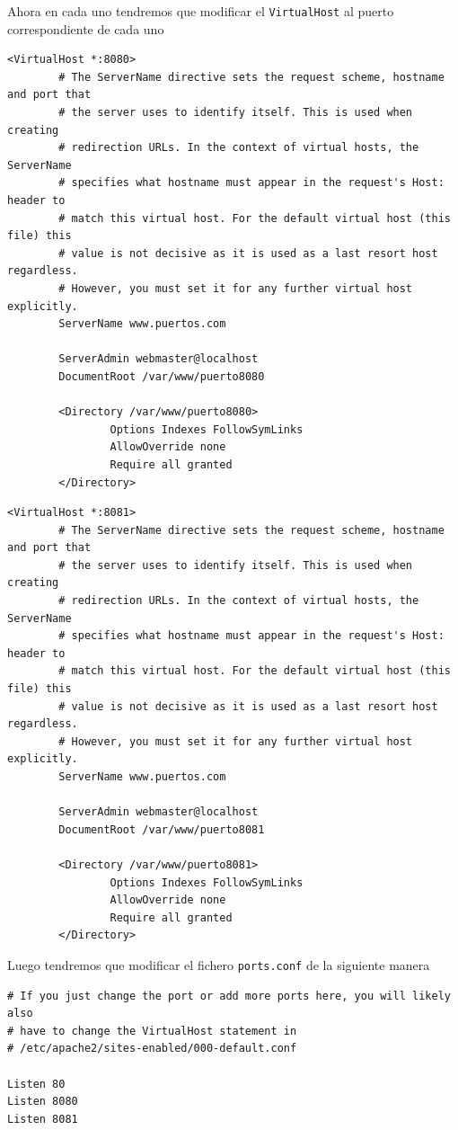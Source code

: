 \documentclass[11pt]{article}
\begin{document}
Ahora en cada uno tendremos que modificar el \texttt{VirtualHost} al puerto correspondiente de cada uno
\begin{verbatim}
<VirtualHost *:8080>
        # The ServerName directive sets the request scheme, hostname and port that
        # the server uses to identify itself. This is used when creating
        # redirection URLs. In the context of virtual hosts, the ServerName
        # specifies what hostname must appear in the request's Host: header to
        # match this virtual host. For the default virtual host (this file) this
        # value is not decisive as it is used as a last resort host regardless.
        # However, you must set it for any further virtual host explicitly.
        ServerName www.puertos.com

        ServerAdmin webmaster@localhost
        DocumentRoot /var/www/puerto8080

        <Directory /var/www/puerto8080>
                Options Indexes FollowSymLinks
                AllowOverride none
                Require all granted
        </Directory>
\end{verbatim}

\begin{verbatim}
<VirtualHost *:8081>
        # The ServerName directive sets the request scheme, hostname and port that
        # the server uses to identify itself. This is used when creating
        # redirection URLs. In the context of virtual hosts, the ServerName
        # specifies what hostname must appear in the request's Host: header to
        # match this virtual host. For the default virtual host (this file) this
        # value is not decisive as it is used as a last resort host regardless.
        # However, you must set it for any further virtual host explicitly.
        ServerName www.puertos.com

        ServerAdmin webmaster@localhost
        DocumentRoot /var/www/puerto8081

        <Directory /var/www/puerto8081>
                Options Indexes FollowSymLinks
                AllowOverride none
                Require all granted
        </Directory>
\end{verbatim}

Luego tendremos que modificar el fichero \texttt{ports.conf} de la siguiente manera
\begin{verbatim}
# If you just change the port or add more ports here, you will likely also
# have to change the VirtualHost statement in
# /etc/apache2/sites-enabled/000-default.conf

Listen 80
Listen 8080
Listen 8081
\end{verbatim}
\end{document}
